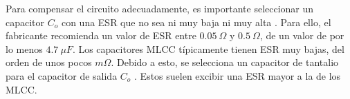 Para compensar el circuito adecuadamente, es importante seleccionar un capacitor $C_o$ con una ESR que no sea ni muy baja ni muy alta \cite{SLVA072}. Para ello, el fabricante recomienda un valor de ESR entre $0.05 \ \Omega$ y $0.5 \  \Omega$, de un valor de por lo menos $4.7 \ \mu F$. Los capacitores MLCC típicamente tienen ESR muy bajas, del orden de unos pocos $m \Omega$. Debido a esto, se selecciona un capacitor de tantalio para el capacitor de salida  $C_o$ \cite{AN1482}. Estos suelen excibir una ESR mayor a la de los MLCC. %






